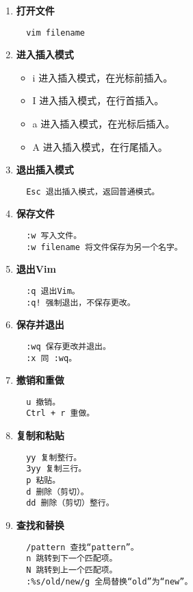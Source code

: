 \documentclass[UTF8]{ctexart}
\begin{document}
\begin{enumerate}
  \item \textbf{打开文件}
  \begin{verbatim}
  vim filename
  \end{verbatim}

  \item \textbf{进入插入模式}
  \begin{itemize}
    \item i 进入插入模式，在光标前插入。
    \item I 进入插入模式，在行首插入。
    \item a 进入插入模式，在光标后插入。
    \item A 进入插入模式，在行尾插入。
  \end{itemize}

  \item \textbf{退出插入模式}
  \begin{verbatim}
  Esc 退出插入模式，返回普通模式。
  \end{verbatim}

  \item \textbf{保存文件}
  \begin{verbatim}
  :w 写入文件。
  :w filename 将文件保存为另一个名字。
  \end{verbatim}

  \item \textbf{退出Vim}
  \begin{verbatim}
  :q 退出Vim。
  :q! 强制退出，不保存更改。
  \end{verbatim}

  \item \textbf{保存并退出}
  \begin{verbatim}
  :wq 保存更改并退出。
  :x 同 :wq。
  \end{verbatim}

  \item \textbf{撤销和重做}
  \begin{verbatim}
  u 撤销。
  Ctrl + r 重做。
  \end{verbatim}

  \item \textbf{复制和粘贴}
  \begin{verbatim}
  yy 复制整行。
  3yy 复制三行。
  p 粘贴。
  d 删除（剪切）。
  dd 删除（剪切）整行。
  \end{verbatim}

  \item \textbf{查找和替换}
  \begin{verbatim}
  /pattern 查找“pattern”。
  n 跳转到下一个匹配项。
  N 跳转到上一个匹配项。
  :%s/old/new/g 全局替换“old”为“new”。
  \end{verbatim}


\end{enumerate}
\end{document}
